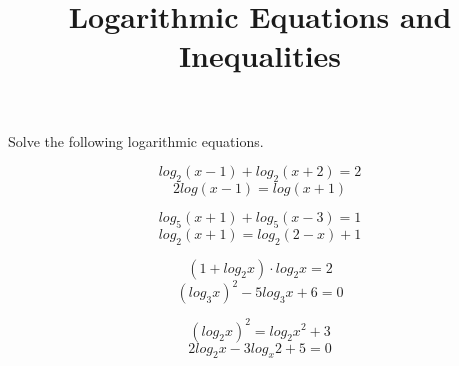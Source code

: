 \documentclass[leqno, 11pt]{article}
\begin{document}
\title{Logarithmic Equations and Inequalities}

Solve the following logarithmic equations.\\

\begin{multicols}{2}
  \begin{equation}
    log_2(x - 1) + log_2(x + 2) = 2
  \end{equation}\break
  \begin{equation}
    2log(x - 1) = log(x + 1)
  \end{equation}
\end{multicols}


\begin{multicols}{2}
  \begin{equation}
	log_5(x + 1) + log_5(x - 3) = 1
  \end{equation}\break
  \begin{equation}
	log_2(x + 1) = log_2(2 - x) + 1
  \end{equation}
\end{multicols}


\clearpage

\begin{multicols}{2}
  \begin{equation}
	  (1 + log_2x) \cdot log_2x = 2
  \end{equation}\break
  \begin{equation}
	  (log_3x)^2 - 5log_3x + 6 = 0
  \end{equation}
\end{multicols}


\begin{multicols}{2}
  \begin{equation}
	  (log_2x)^2 = log_2x^2 + 3
  \end{equation}\break
  \begin{equation}
	  2log_2x - 3log_x2 + 5 = 0
  \end{equation}
\end{multicols}


\clearpage
\end{document}
